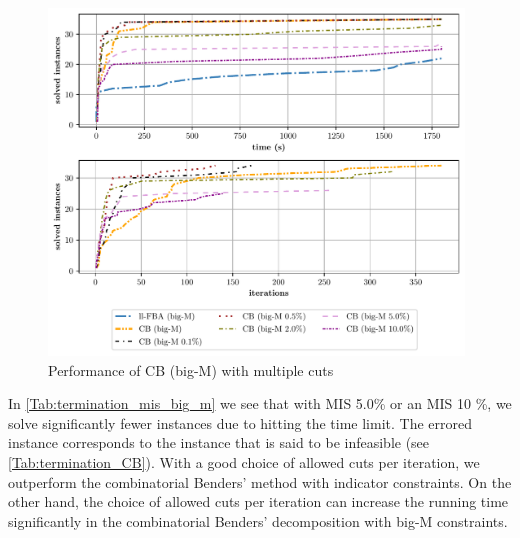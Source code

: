 \begin{figure}[h!]
    \centering
    \includegraphics[width=0.983\textwidth]{Images/mis_comparison_solved_instances_big_m.pdf}
    \caption{Performance of \textsf{CB (big-M)} with multiple cuts}
    \label{fig:mis_comparison_solved_instances_big_m}
\end{figure}

\newpage
In \cref{Tab:termination_mis_big_m} we see that with MIS 5.0\% or an MIS 10 \%, we solve significantly fewer instances due to hitting the time limit. The errored instance corresponds to the instance that is said to be infeasible (see \cref{Tab:termination_CB}). With a good choice of allowed cuts per iteration, we outperform the combinatorial Benders' method with indicator constraints. On the other hand, the choice of allowed cuts per iteration can increase the running time significantly in the combinatorial Benders' decomposition with big-M constraints.


